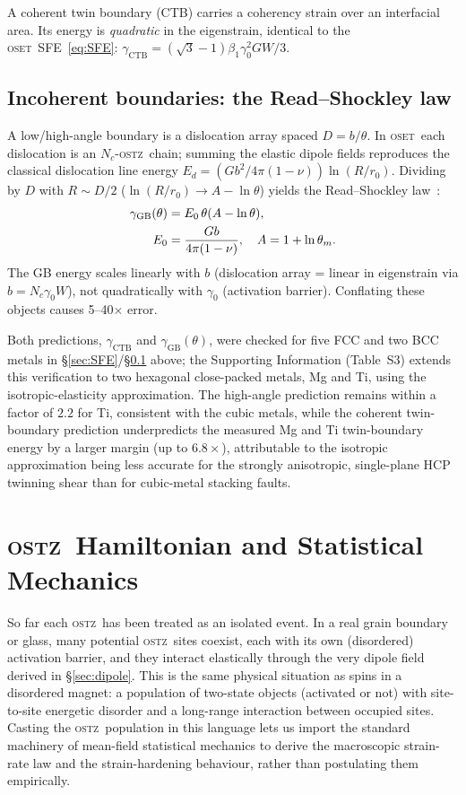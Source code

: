 \documentclass[5p,sort&compress]{elsarticle}
\newcommand{\OSTZ}{\textsc{ostz}}
\newcommand{\OSET}{\textsc{oset}}
\newcommand{\gz}{\gamma_0}
\begin{document}
A coherent twin boundary (CTB) carries a coherency strain over an
interfacial area. Its energy is \emph{quadratic} in the eigenstrain,
identical to the \OSET\ SFE~\eqref{eq:SFE}:
$\gamma_\text{CTB}=(\sqrt3-1)\beta_1\gz^2GW/3$.

\subsection{Incoherent boundaries: the Read--Shockley law}
\label{sec:RS}

A low/high-angle boundary is a dislocation array spaced $D=b/\theta$.
In \OSET\ each dislocation is an $N_c$-\OSTZ\ chain; summing the elastic
dipole fields reproduces the classical dislocation line energy
$E_d=(Gb^2/4\pi(1-\nu))\ln(R/r_0)$. Dividing by $D$ with
$R\sim D/2$ ($\ln(R/r_0)\to A-\ln\theta$) yields the
Read--Shockley law~\cite{readshockley1950}:
\begin{align}
  \gamma_\text{GB}(\theta)&=E_0\,\theta(A-\ln\theta),
    \label{eq:RS}\\
  E_0&=\frac{Gb}{4\pi(1-\nu)},\quad A=1+\ln\theta_m.\notag
\end{align}
The GB energy scales linearly with $b$ (dislocation array = linear in
eigenstrain via $b=N_c\gz W$), not quadratically with $\gz$
(activation barrier). Conflating these objects causes 5--40$\times$
error.

Both predictions, $\gamma_\text{CTB}$ and $\gamma_\text{GB}(\theta)$,
were checked for five FCC and two BCC metals in
\S\ref{sec:SFE}/\S\ref{sec:RS} above; the Supporting Information
(Table~S3) extends this verification to two hexagonal close-packed
metals, Mg and Ti, using the isotropic-elasticity approximation.
The high-angle prediction remains within a factor of $2.2$ for Ti,
consistent with the cubic metals, while the coherent twin-boundary
prediction underpredicts the measured Mg and Ti twin-boundary energy
by a larger margin (up to $6.8\times$), attributable to the
isotropic approximation being less accurate for the strongly
anisotropic, single-plane HCP twinning shear than for cubic-metal
stacking faults.

\section{\OSTZ\ Hamiltonian and Statistical Mechanics}
\label{sec:stat}

So far each \OSTZ\ has been treated as an isolated event. In a real
grain boundary or glass, many potential \OSTZ\ sites coexist, each
with its own (disordered) activation barrier, and they interact
elastically through the very dipole field derived in
\S\ref{sec:dipole}. This is the same physical situation as spins in
a disordered magnet: a population of two-state objects (activated or
not) with site-to-site energetic disorder and a long-range
interaction between occupied sites. Casting the \OSTZ\ population in
this language lets us import the standard machinery of mean-field
statistical mechanics to derive the macroscopic strain-rate law and
the strain-hardening behaviour, rather than postulating them
empirically.
\end{document}
